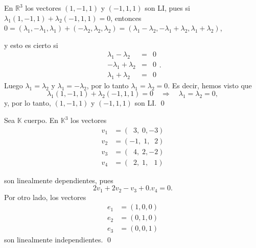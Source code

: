 \documentclass[handout]{beamer} %
\newcommand{\R}{\mathbb R}
\newcommand{\K}{\mathbb K}
\begin{document}
    
    \begin{frame}
        
    \begin{ejemplo}
    En $\R^3$  los vectores $(1,-1,1)$ y $(-1,1,1)$ son LI, pues si $\lambda_1(1,-1,1)+\lambda_2(-1,1,1) =0$,  entonces $0= (\lambda_1,-\lambda_1,\lambda_1)+(-\lambda_2,\lambda_2,\lambda_2) =  (\lambda_1-\lambda_2,-\lambda_1+\lambda_2,\lambda_1+\lambda_2)$, 
    
    y esto es cierto si 
    \begin{equation*}
        \begin{array}{rcl}
        \lambda_1-\lambda_2 &=& 0 \\
        -\lambda_1+\lambda_2 &=& 0 \\
        \lambda_1+\lambda_2 &=& 0 
        \end{array}.
    \end{equation*} 
    Luego $\lambda_1 = \lambda_2$ y $\lambda_1 = -\lambda_2$, por lo tanto $\lambda_1 = \lambda_2 =0$. Es decir,  hemos visto que 
    $$
    \lambda_1(1,-1,1)+\lambda_2(-1,1,1) =0 \quad \Rightarrow \quad\lambda_1 = \lambda_2 =0,
    $$
    y, por lo tanto,  $(1,-1,1)$ y $(-1,1,1)$ son LI. \qed
    \end{ejemplo}
    \end{frame}  
    
    
    \begin{frame}
        
    \begin{ejemplo} Sea $\K$  cuerpo. En $\K^3$ los vectores
    \begin{align*}
    v_1 &= (\;\;3,\;0,-3) \\
    v_2 &= (-1,\;1,\;\;2) \\
    v_3 &= (\;\;4,\;2,-2) \\
    v_4 &= (\;\;2,\;1,\,\;\;1)
    \end{align*}
    
    son linealmente dependientes, pues
    $$
    2v_1+2v_2 -v_3 +0.v_4 =0.
    $$
    Por otro lado, los vectores
    \begin{align*}
    e_1 &= (1,0,0) \\
    e_2 &= (0,1,0) \\
    e_3 &= (0,0,1) 
    \end{align*}
    son linealmente independientes. \qed
    \end{ejemplo}
    
    \end{frame}  
    
\end{document}
